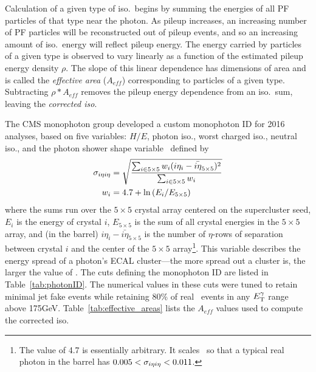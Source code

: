 Calculation of a given type of iso.\ begins by summing the energies of all PF particles of that type near the photon. As pileup increases, an increasing number of PF particles
will be reconstructed out of pileup events, and so an increasing amount of iso.\ energy will reflect pileup energy. The energy carried by particles of a given type is observed to vary
linearly as a function of the estimated pileup energy density $\rho$. The slope of this linear dependence has dimensions of area and is called the \textit{effective area} ($A_{eff}$)
corresponding to particles of a given type. Subtracting $\rho{*}A_{eff}$ removes the pileup energy dependence from an iso.\ sum, leaving the \textit{corrected iso}.

The CMS monophoton group developed a custom monophoton ID for 2016 analyses, based on five variables: $H/E$, photon iso., worst charged iso., neutral iso., and the photon shower shape
variable \sieie\ defined by
\begin{equation}
\begin{gathered}
\begin{aligned}
\sigma_{i\eta i\eta} &= \sqrt{\frac{\sum_{i\in5{\times}5} w_{i}(i\eta_{i} - {\bar{i\eta}}_{5{\times}5})^{2}}{\sum_{i\in5{\times}5} w_{i}}}\\
            w_{i} &= 4.7 + \ln{(E_{i} / E_{5{\times}5})}
\end{aligned}
\end{gathered}
\label{eq:sieie}
\end{equation}
where the sums run over the $5{\times}5$ crystal array centered on the supercluster seed, $E_{i}$ is the energy of crystal $i$, $E_{5{\times}5}$ is the sum of all crystal energies
in the $5{\times}5$ array, and (in the barrel) $i\eta_{i} - {\bar{i\eta}}_{5{\times}5}$ is the number of $\eta$-rows of separation between crystal $i$ and the center of the $5{\times}5$ array\footnote{The value
of 4.7 is essentially arbitrary. It scales \sieie\ so that a typical real photon in the barrel has $0.005 < \sigma_{i\eta i\eta} < 0.011$.}. This variable
describes the energy spread of a photon's ECAL cluster---the more spread out a cluster is, the larger the value of \sieie.
The cuts defining the monophoton ID are listed in Table~\ref{tab:photonID}. The numerical values in these cuts were tuned to retain minimal jet fake events while retaining 80\% of
real \zinvg\ events in any $E_\mathrm{T}^{\gamma}$ range above 175\unit{GeV}. Table~\ref{tab:effective_areas} lists the $A_{eff}$ values used to compute the corrected iso.

